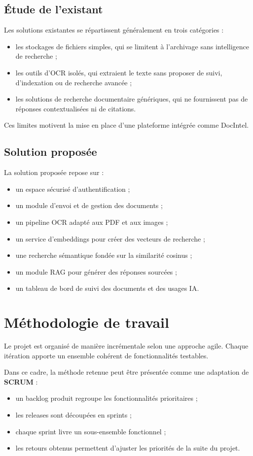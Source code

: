 \documentclass[12pt,a4paper]{report}
\begin{document}
\subsection{\'Etude de l'existant}
Les solutions existantes se répartissent généralement en trois catégories :
\begin{itemize}
  \item les stockages de fichiers simples, qui se limitent à l'archivage sans intelligence de recherche ;
  \item les outils d'OCR isolés, qui extraient le texte sans proposer de suivi, d'indexation ou de recherche avancée ;
  \item les solutions de recherche documentaire génériques, qui ne fournissent pas de réponses contextualisées ni de citations.
\end{itemize}

Ces limites motivent la mise en place d'une plateforme intégrée comme DocIntel.

\subsection{Solution propos\'ee}
La solution proposée repose sur :
\begin{itemize}
  \item un espace sécurisé d'authentification ;
  \item un module d'envoi et de gestion des documents ;
  \item un pipeline OCR adapté aux PDF et aux images ;
  \item un service d'embeddings pour créer des vecteurs de recherche ;
  \item une recherche sémantique fondée sur la similarité cosinus ;
  \item un module RAG pour générer des réponses sourcées ;
  \item un tableau de bord de suivi des documents et des usages IA.
\end{itemize}

\section{M\'ethodologie de travail}
Le projet est organisé de manière incrémentale selon une approche agile. Chaque itération apporte un ensemble cohérent de fonctionnalités testables.

Dans ce cadre, la méthode retenue peut être présentée comme une adaptation de \textbf{SCRUM} :
\begin{itemize}
  \item un backlog produit regroupe les fonctionnalités prioritaires ;
  \item les releases sont découpées en sprints ;
  \item chaque sprint livre un sous-ensemble fonctionnel ;
  \item les retours obtenus permettent d'ajuster les priorités de la suite du projet.
\end{itemize}
\end{document}
